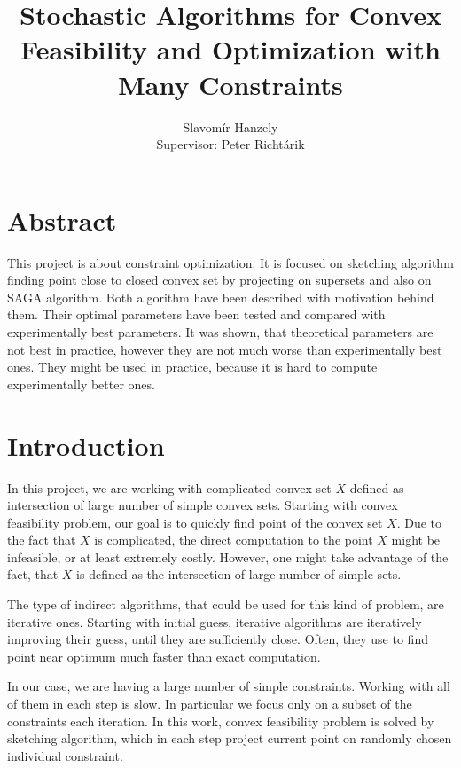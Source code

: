 \documentclass[11pt]{book}
\theoremstyle{definition}
\begin{document}
	\title{\textbf{Stochastic Algorithms for Convex Feasibility and Optimization with Many Constraints}}
	\author{Slavomír Hanzely\\[1cm]{\small Supervisor: Peter Richt\'{a}rik}} 
	\maketitle
	
	\chapter*{\centering Abstract}
	
	This project is about constraint optimization. It is focused on sketching algorithm finding point close to closed convex set by projecting on supersets and also on SAGA algorithm. Both algorithm have been described with motivation behind them. Their optimal parameters have been tested and compared with experimentally best parameters. It was shown, that theoretical parameters are not best in practice, however they are not much worse than experimentally best ones. They might be used in practice, because it is hard to compute experimentally better ones.
	
	\tableofcontents
	
	\chapter{Introduction}
	
	In this project, we are working with complicated convex set $X$ defined as intersection of large number of simple convex sets. Starting with convex feasibility problem, our goal is to quickly find point of the convex set $X$. Due to the fact that $X$ is complicated, the direct computation to the point $X$ might be infeasible, or at least extremely costly. However, one might take advantage of the fact, that $X$ is defined as the intersection of large number of simple sets.
	
	The type of indirect algorithms, that could be used for this kind of problem, are iterative ones. Starting with initial guess, iterative algorithms are iteratively improving their guess, until they are sufficiently close. Often, they use to find point near optimum much faster than exact computation.
	
	In our case, we are having a large number of simple constraints. Working with all of them in each step is slow. In particular we focus only on a subset of the constraints each iteration. In this work, convex feasibility problem is solved by sketching algorithm, which in each step project current point on randomly chosen individual constraint\cite{sketchAndProject,projectionFeasibility}.\\
	
\end{document}
